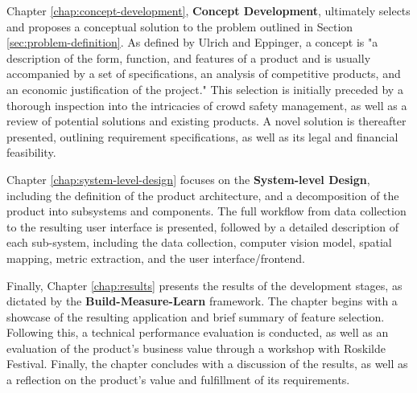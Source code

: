 Chapter \ref{chap:concept-development}, \textbf{Concept Development}, ultimately selects and proposes a conceptual solution to the problem outlined in Section \ref{sec:problem-definition}. As defined by Ulrich and Eppinger, a concept is "a description of the form, function, and features of a product and is usually accompanied by a set of specifications, an analysis of competitive products, and an economic justification of the project." \cite{ulrich_eppinger} This selection is initially preceded by a thorough inspection into the intricacies of crowd safety management, as well as a review of potential solutions and existing products. A novel solution is thereafter presented, outlining requirement specifications, as well as its legal and financial feasibility.

Chapter \ref{chap:system-level-design} focuses on the \textbf{System-level Design}, including the definition of the product architecture, and a decomposition of the product into subsystems and components. The full workflow from data collection to the resulting user interface is presented, followed by a detailed description of each sub-system, including the data collection, computer vision model, spatial mapping, metric extraction, and the user interface/frontend.

Finally, Chapter \ref{chap:results} presents the results of the development stages, as dictated by the \textbf{Build-Measure-Learn} framework. The chapter begins with a showcase of the resulting application and brief summary of feature selection. Following this, a technical performance evaluation is conducted, as well as an evaluation of the product's business value through a workshop with Roskilde Festival. Finally, the chapter concludes with a discussion of the results, as well as a reflection on the product's value and fulfillment of its requirements.